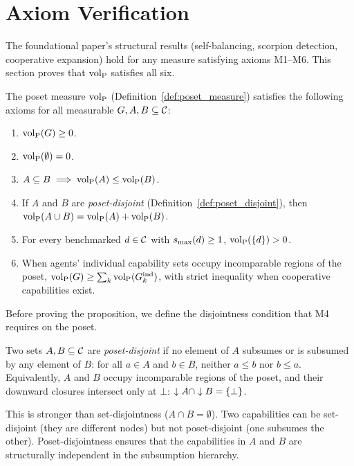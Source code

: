 \section{Axiom Verification}
\label{sec:axioms}

The foundational paper's structural results (self-balancing, scorpion
detection, cooperative expansion) hold for any measure satisfying axioms
M1--M6. This section proves that ${\operatorname{vol}_{\mathrm{P}}}$ satisfies all six.

\begin{proposition}
\label{prop:axioms}
The poset measure ${\operatorname{vol}_{\mathrm{P}}}$ (Definition~\ref{def:poset_measure}) satisfies
    the following axioms for all measurable $G, A, B \subseteq \mathcal{C}$:
\begin{enumerate}
\item[\textbf{(M1)}] ${\operatorname{vol}_{\mathrm{P}}}(G) \geq 0$.
\item[\textbf{(M2)}] ${\operatorname{vol}_{\mathrm{P}}}(\emptyset) = 0$.
\item[\textbf{(M3)}] $A \subseteq B \implies {\operatorname{vol}_{\mathrm{P}}}(A) \leq {\operatorname{vol}_{\mathrm{P}}}(B)$.
\item[\textbf{(M4)}] If $A$ and $B$ are \emph{poset-disjoint}
    (Definition~\ref{def:poset_disjoint}), then
    ${\operatorname{vol}_{\mathrm{P}}}(A \cup B) = {\operatorname{vol}_{\mathrm{P}}}(A) + {\operatorname{vol}_{\mathrm{P}}}(B)$.
\item[\textbf{(M5)}] For every benchmarked $d \in \mathcal{C}$ with $s_{\mathrm{max}}(d) \geq 1$,
    ${\operatorname{vol}_{\mathrm{P}}}(\{d\}) > 0$.
\item[\textbf{(M6)}] When agents' individual capability sets occupy
    incomparable regions of the poset, ${\operatorname{vol}_{\mathrm{P}}}(G) \geq \sum_k
    {\operatorname{vol}_{\mathrm{P}}}(G_{k}^{\mathrm{ind}})$, with strict inequality when cooperative capabilities
    exist.
\end{enumerate}
\end{proposition}

Before proving the proposition, we define the disjointness condition that M4
requires on the poset.

\begin{definition}
\label{def:poset_disjoint}
Two sets $A, B \subseteq \mathcal{C}$ are \emph{poset-disjoint} if no element of $A$
    subsumes or is subsumed by any element of $B$: for all $a \in A$ and $b
    \in B$, neither $a \leq b$ nor $b \leq a$. Equivalently, $A$ and $B$
    occupy incomparable regions of the poset, and their downward closures
    intersect only at $\bot$: $\downarrow A \cap \downarrow B = \{\bot\}$.
\end{definition}

This is stronger than set-disjointness ($A \cap B = \emptyset$). Two
capabilities can be set-disjoint (they are different nodes) but not
poset-disjoint (one subsumes the other). Poset-disjointness ensures that
the capabilities in $A$ and $B$ are structurally independent in the
subsumption hierarchy.

